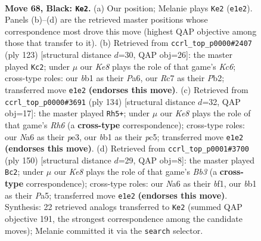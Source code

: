 \documentclass[11pt]{article}
\begin{document}
\clearpage

\begin{figure}[p]\centering
\begin{subfigure}{0.46\textwidth}\centering
\resizebox{\linewidth}{!}{%
\newchessgame
\chessboard[
  setfen={8/2r2p1p/n5p1/4P3/b4Pp1/8/6KP/1B2kN2 b - - 27 68},
  showmover=false,
  pgfstyle=straightmove, color=movearrow, markmove={e1-e2}
]}
\caption{}
\end{subfigure}\hfill
\begin{subfigure}{0.46\textwidth}\centering
\resizebox{\linewidth}{!}{%
\newchessgame
\chessboard[
  setfen={8/6p1/p4pP1/P3pP2/4P3/2k1K3/1p1N4/8 b - - 10 62},
  showmover=false,
  pgfstyle=straightmove, color=movearrow, markmove={c3-c2}
]}
\caption{}
\end{subfigure}
\\[4pt]
\begin{subfigure}{0.46\textwidth}\centering
\resizebox{\linewidth}{!}{%
\newchessgame
\chessboard[
  setfen={8/5N2/P5nR/2p2k2/6p1/2P1p1P1/r6P/4K3 w - - 4 68},
  showmover=false,
  pgfstyle=straightmove, color=movearrow, markmove={h6-h5}
]}
\caption{}
\end{subfigure}\hfill
\begin{subfigure}{0.46\textwidth}\centering
\resizebox{\linewidth}{!}{%
\newchessgame
\chessboard[
  setfen={5B2/7p/p5p1/P2nkp2/7P/1B4P1/3K1P2/5b2 w - - 1 76},
  showmover=false,
  pgfstyle=straightmove, color=movearrow, markmove={b3-c2}
]}
\caption{}
\end{subfigure}
\caption{\textbf{Move 68, Black: \texttt{Ke2}.} (a) Our position; Melanie plays \texttt{Ke2} (\texttt{e1e2}). Panels (b)--(d) are the retrieved master positions whose correspondence most drove this move (highest QAP objective among those that transfer to it). (b) Retrieved from \texttt{ccrl\_top\_p0000\#2407} (ply 123) [structural distance $d$=30, QAP obj=26]: the master played \texttt{Kc2}; under $\mu$ our \emph{Ke8} plays the role of that game's \emph{Kc6}; cross-type roles: our \emph{b}b1 as their \emph{P}a6, our \emph{R}c7 as their \emph{P}b2; transferred move \texttt{e1e2} \textbf{(endorses this move)}. (c) Retrieved from \texttt{ccrl\_top\_p0000\#3691} (ply 134) [structural distance $d$=32, QAP obj=17]: the master played \texttt{Rh5+}; under $\mu$ our \emph{Ke8} plays the role of that game's \emph{Rh6} (a \textbf{cross-type} correspondence); cross-type roles: our \emph{N}a6 as their \emph{p}e3, our \emph{b}b1 as their \emph{p}c5; transferred move \texttt{e1e2} \textbf{(endorses this move)}. (d) Retrieved from \texttt{ccrl\_top\_p0001\#3700} (ply 150) [structural distance $d$=29, QAP obj=8]: the master played \texttt{Bc2}; under $\mu$ our \emph{Ke8} plays the role of that game's \emph{Bb3} (a \textbf{cross-type} correspondence); cross-type roles: our \emph{N}a6 as their \emph{b}f1, our \emph{b}b1 as their \emph{P}a5; transferred move \texttt{e1e2} \textbf{(endorses this move)}. Synthesis: 22 retrieved analogs transferred to \texttt{Ke2} (summed QAP objective 191, the strongest correspondence among the candidate moves); Melanie committed it via the \texttt{search} selector.}
\label{fig:thought-m135}
\end{figure}
\end{document}

